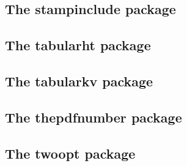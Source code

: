 \documentclass[a4paper,12pt]{article}
\makeatletter
\newcommand*{\xpackage}[1]{\textsf{#1}}
\newcommand*{\xext}[1]{\texttt{.#1}}
\newcommand*{\cs}[1]{\texttt{\textbackslash#1}}
\newcommand*{\tocinclude}[1]{%
  \setcounter{tocdepth}{3}%
  \begingroup
    \makeatletter
    \def\@prj{#1}%
    \let\contentsline\foreign@contentsline
  \endgroup
}
\def\foreign@contentsline#1#2#3#4{%
  \ifx\\#4\\%
    \csname l@#1\endcsname{#2}{#3}%
  \else
    \ifHy@linktocpage
      \csname l@#1\endcsname{{#2}}{%
        \hyper@linkfile{#3}{\@prj.pdf}{#4}%
      }%
    \else
      \csname l@#1\endcsname{%
        \hyper@linkfile{#2}{\@prj.pdf}{#4}%
      }{#3}%
    \fi
  \fi
}%
\newcommand*{\pkgsectformat}[1]{%
  \texorpdfstring{%
    \textcolor{link}{The} %
    \xpackage{#1} %
    \textcolor{link}{package}%
  }{#1}%
}
\makeatother
\begin{document}
\newpage
\subsection{\pkgsectformat{stampinclude}}
\label{stampinclude}
\begin{abstract}
The package replaces \cs{includeonly} and selects the files for
\cs{include} by inspecting the time stamp of the \xext{aux} file.
The file is selected for inclusion if the \xext{aux} file does
not yet exist or is older than the corresponding \xext{tex} file.
\end{abstract}
\tocinclude{stampinclude}

\newpage
\subsection{\pkgsectformat{tabularht}}
\label{tabularht}
\begin{abstract}
This package defines some environments that adds
a height specification to tabular and array.
\end{abstract}
\tocinclude{tabularht}

\newpage
\subsection{\pkgsectformat{tabularkv}}
\label{tabularkv}
\begin{abstract}
This package adds a key value interface for tabular
by the new environment \texttt{tabularkv}. Thus the
\TeX\ source code looks better by named parameters,
especially if package \xpackage{tabularht} is used.
\end{abstract}
\tocinclude{tabularkv}

\newpage
\subsection{\pkgsectformat{thepdfnumber}}
\label{thepdfnumber}
\begin{abstract}
The package converts real numbers to a minimal representation
that is stripped from leading or trailing zeros,
plus signs and decimal point if not necessary.
\end{abstract}
\tocinclude{thepdfnumber}


\newpage
\subsection{\pkgsectformat{twoopt}}
\label{twoopt}
\begin{abstract}
This package provides commands to define macros with two
optional arguments.
\end{abstract}
\tocinclude{twoopt}
\end{document}
